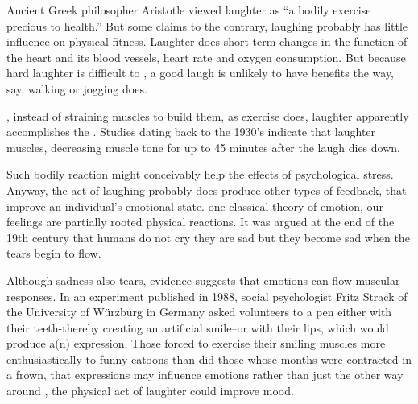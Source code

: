 
\qquad Ancient Greek philosopher Aristotle viewed laughter as ``a bodily exercise precious to health.'' But \underline{\quad} some claims to the contrary, laughing probably has little influence on physical fitness. Laughter does \underline{\quad} short-term changes in the function of the heart and its blood vessels, \underline{\quad} heart rate and oxygen consumption. But because hard laughter is difficult to \underline{\quad}, a good laugh is unlikely to have \underline{\quad} benefits the way, say, walking or jogging does.

\qquad \underline{\quad}, instead of straining muscles to build them, as exercise does, laughter apparently accomplishes the \underline{\quad}. Studies dating back to the 1930's indicate that laughter \underline{\quad} muscles, decreasing muscle tone for up to 45 minutes after the laugh dies down.

\qquad Such bodily reaction might conceivably help \underline{\quad} the effects of psychological stress. Anyway, the act of laughing probably does produce other types of \underline{\quad} feedback, that improve an individual's emotional state. \underline{\quad} one classical theory of emotion, our feelings are partially rooted \underline{\quad} physical reactions. It was argued at the end of the 19th century that humans do not cry \underline{\quad} they are sad but they become sad when the tears begin to flow.

\qquad Although sadness also \underline{\quad} tears, evidence suggests that emotions can flow \underline{\quad} muscular responses. In an experiment published in 1988, social psychologist Fritz Strack of the University of W\"{u}rzburg in Germany asked volunteers to \underline{\quad} a pen either with their teeth-thereby creating an artificial smile--or with their lips, which would produce a(n) \underline{\quad} expression. Those forced to exercise their smiling muscles \underline{\quad} more enthusiastically to funny catoons than did those whose months were contracted in a frown, \underline{\quad} that expressions may influence emotions rather than just the other way around \underline{\quad}, the physical act of laughter could improve mood.

\vspace{6pt}

